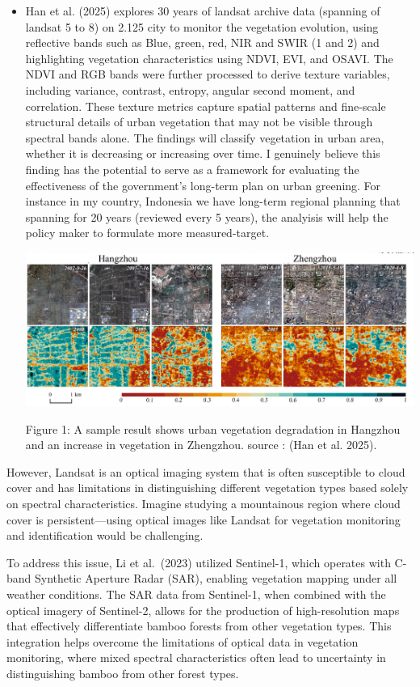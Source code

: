 \documentclass[
  letterpaper,
  DIV=11,
  numbers=noendperiod]{scrreprt}
\begin{document}
\begin{itemize}
\item
  Han et al. (2025) explores 30 years of landsat archive data (spanning
  of landsat 5 to 8) on 2.125 city to monitor the vegetation evolution,
  using reflective bands such as Blue, green, red, NIR and SWIR (1 and
  2) and highlighting vegetation characteristics using NDVI, EVI, and
  OSAVI. The NDVI and RGB bands were further processed to derive texture
  variables, including variance, contrast, entropy, angular second
  moment, and correlation. These texture metrics capture spatial
  patterns and fine-scale structural details of urban vegetation that
  may not be visible through spectral bands alone. The findings will
  classify vegetation in urban area, whether it is decreasing or
  increasing over time. I genuinely believe this finding has the
  potential to serve as a framework for evaluating the effectiveness of
  the government's long-term plan on urban greening. For instance in my
  country, Indonesia we have long-term regional planning that spanning
  for 20 years (reviewed every 5 years), the analyisis will help the
  policy maker to formulate more measured-target.

  \includegraphics[width=6.96875in,height=\textheight]{images/clipboard-1072383063.png}

  Figure 1: A sample result shows urban vegetation degradation in
  Hangzhou and an increase in vegetation in Zhengzhou. source : (Han et
  al. 2025).
\end{itemize}

However, Landsat is an optical imaging system that is often susceptible
to cloud cover and has limitations in distinguishing different
vegetation types based solely on spectral characteristics. Imagine
studying a mountainous region where cloud cover is persistent---using
optical images like Landsat for vegetation monitoring and identification
would be challenging.

To address this issue, Li et al.~(2023) utilized Sentinel-1, which
operates with C-band Synthetic Aperture Radar (SAR), enabling vegetation
mapping under all weather conditions. The SAR data from Sentinel-1, when
combined with the optical imagery of Sentinel-2, allows for the
production of high-resolution maps that effectively differentiate bamboo
forests from other vegetation types. This integration helps overcome the
limitations of optical data in vegetation monitoring, where mixed
spectral characteristics often lead to uncertainty in distinguishing
bamboo from other forest types.
\end{document}
